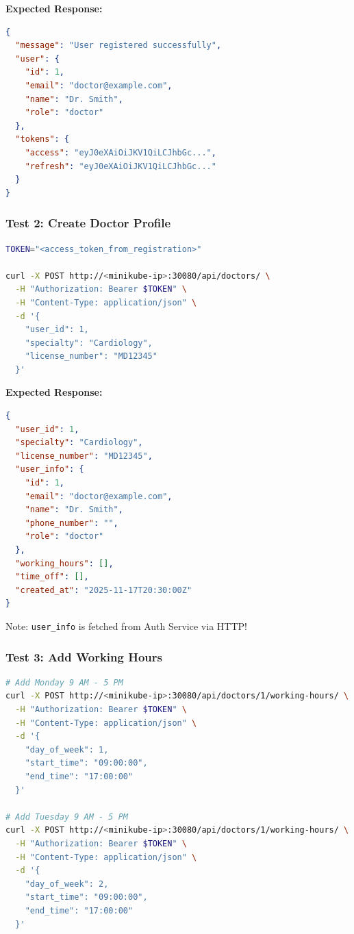 \documentclass[12pt,a4paper]{article}
\begin{document}
\textbf{Expected Response:}
\begin{lstlisting}[language=json]
{
  "message": "User registered successfully",
  "user": {
    "id": 1,
    "email": "doctor@example.com",
    "name": "Dr. Smith",
    "role": "doctor"
  },
  "tokens": {
    "access": "eyJ0eXAiOiJKV1QiLCJhbGc...",
    "refresh": "eyJ0eXAiOiJKV1QiLCJhbGc..."
  }
}
\end{lstlisting}

\subsubsection{Test 2: Create Doctor Profile}
\begin{lstlisting}[language=bash]
TOKEN="<access_token_from_registration>"

curl -X POST http://<minikube-ip>:30080/api/doctors/ \
  -H "Authorization: Bearer $TOKEN" \
  -H "Content-Type: application/json" \
  -d '{
    "user_id": 1,
    "specialty": "Cardiology",
    "license_number": "MD12345"
  }'
\end{lstlisting}

\textbf{Expected Response:}
\begin{lstlisting}[language=json]
{
  "user_id": 1,
  "specialty": "Cardiology",
  "license_number": "MD12345",
  "user_info": {
    "id": 1,
    "email": "doctor@example.com",
    "name": "Dr. Smith",
    "phone_number": "",
    "role": "doctor"
  },
  "working_hours": [],
  "time_off": [],
  "created_at": "2025-11-17T20:30:00Z"
}
\end{lstlisting}

Note: \texttt{user\_info} is fetched from Auth Service via HTTP!

\subsubsection{Test 3: Add Working Hours}
\begin{lstlisting}[language=bash]
# Add Monday 9 AM - 5 PM
curl -X POST http://<minikube-ip>:30080/api/doctors/1/working-hours/ \
  -H "Authorization: Bearer $TOKEN" \
  -H "Content-Type: application/json" \
  -d '{
    "day_of_week": 1,
    "start_time": "09:00:00",
    "end_time": "17:00:00"
  }'

# Add Tuesday 9 AM - 5 PM
curl -X POST http://<minikube-ip>:30080/api/doctors/1/working-hours/ \
  -H "Authorization: Bearer $TOKEN" \
  -H "Content-Type: application/json" \
  -d '{
    "day_of_week": 2,
    "start_time": "09:00:00",
    "end_time": "17:00:00"
  }'
\end{lstlisting}
\end{document}
